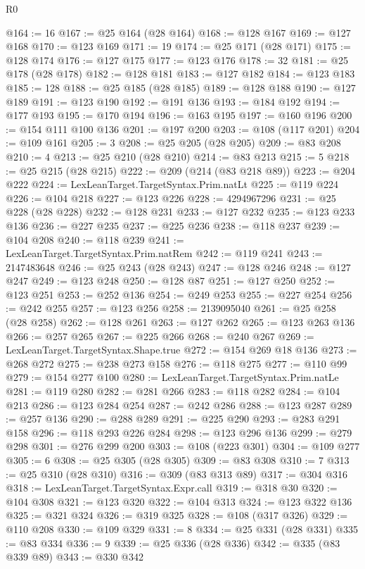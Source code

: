 \begin{lexlean}{R0}
\begin{coremodule}
@164 := 16
@167 := @25 @164 (@28 @164)
@168 := @128 @167
@169 := @127 @168
@170 := @123 @169
@171 := 19
@174 := @25 @171 (@28 @171)
@175 := @128 @174
@176 := @127 @175
@177 := @123 @176
@178 := 32
@181 := @25 @178 (@28 @178)
@182 := @128 @181
@183 := @127 @182
@184 := @123 @183
@185 := 128
@188 := @25 @185 (@28 @185)
@189 := @128 @188
@190 := @127 @189
@191 := @123 @190
@192 := @191 @136
@193 := @184 @192
@194 := @177 @193
@195 := @170 @194
@196 := @163 @195
@197 := @160 @196
@200 := @154 @111 @100 @136
@201 := @197 @200
@203 := @108 (@117 @201)
@204 := @109 @161
@205 := 3
@208 := @25 @205 (@28 @205)
@209 := @83 @208
@210 := 4
@213 := @25 @210 (@28 @210)
@214 := @83 @213
@215 := 5
@218 := @25 @215 (@28 @215)
@222 := @209 (@214 (@83 @218 @89))
@223 := @204 @222
@224 := LexLeanTarget.TargetSyntax.Prim.natLt
@225 := @119 @224
@226 := @104 @218
@227 := @123 @226
@228 := 4294967296
@231 := @25 @228 (@28 @228)
@232 := @128 @231
@233 := @127 @232
@235 := @123 @233 @136
@236 := @227 @235
@237 := @225 @236
@238 := @118 @237
@239 := @104 @208
@240 := @118 @239
@241 := LexLeanTarget.TargetSyntax.Prim.natRem
@242 := @119 @241
@243 := 2147483648
@246 := @25 @243 (@28 @243)
@247 := @128 @246
@248 := @127 @247
@249 := @123 @248
@250 := @128 @87
@251 := @127 @250
@252 := @123 @251
@253 := @252 @136
@254 := @249 @253
@255 := @227 @254
@256 := @242 @255
@257 := @123 @256
@258 := 2139095040
@261 := @25 @258 (@28 @258)
@262 := @128 @261
@263 := @127 @262
@265 := @123 @263 @136
@266 := @257 @265
@267 := @225 @266
@268 := @240 @267
@269 := LexLeanTarget.TargetSyntax.Shape.true
@272 := @154 @269 @18 @136
@273 := @268 @272
@275 := @238 @273 @158
@276 := @118 @275
@277 := @110 @99
@279 := @154 @277 @100
@280 := LexLeanTarget.TargetSyntax.Prim.natLe
@281 := @119 @280
@282 := @281 @266
@283 := @118 @282
@284 := @104 @213
@286 := @123 @284 @254
@287 := @242 @286
@288 := @123 @287
@289 := @257 @136
@290 := @288 @289
@291 := @225 @290
@293 := @283 @291 @158
@296 := @118 @293 @226 @284
@298 := @123 @296 @136
@299 := @279 @298
@301 := @276 @299 @200
@303 := @108 (@223 @301)
@304 := @109 @277
@305 := 6
@308 := @25 @305 (@28 @305)
@309 := @83 @308
@310 := 7
@313 := @25 @310 (@28 @310)
@316 := @309 (@83 @313 @89)
@317 := @304 @316
@318 := LexLeanTarget.TargetSyntax.Expr.call
@319 := @318 @30
@320 := @104 @308
@321 := @123 @320
@322 := @104 @313
@324 := @123 @322 @136
@325 := @321 @324
@326 := @319 @325
@328 := @108 (@317 @326)
@329 := @110 @208
@330 := @109 @329
@331 := 8
@334 := @25 @331 (@28 @331)
@335 := @83 @334
@336 := 9
@339 := @25 @336 (@28 @336)
@342 := @335 (@83 @339 @89)
@343 := @330 @342

\end{coremodule}
\end{lexlean}
